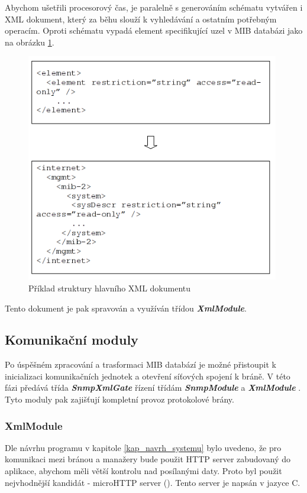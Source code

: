Abychom ušetřili procesorový čas, je paralelně s generováním schématu vytvářen i XML dokument, který za běhu slouží k vyhledávání a ostatním potřebným
operacím. Oproti schématu vypadá element specifikující uzel v MIB databázi jako na obrázku \ref{obr_impl_xml_element}.
\begin{figure}[htp]
	\begin{center}
		\includegraphics[height=10cm]{obrazky/05_element_xml.png}
		\caption{Příklad struktury hlavního XML dokumentu}
		\label{obr_impl_xml_element}
	\end{center}
\end{figure}

Tento dokument je pak spravován a využíván třídou \textit{\textbf{XmlModule}}.


\subsection{Komunikační moduly}
Po úspěšném zpracování a trasformaci MIB databází je možné přistoupit k inicializaci komunikačních jednotek a otevření síťových spojení k bráně.
V této fázi předává třída \textit{ \textbf{SnmpXmlGate} } řízení třídám \textit{ \textbf{SnmpModule} } a \textit{ \textbf{XmlModule} }. Tyto
moduly pak zajišťují kompletní provoz protokolové brány.

\subsubsection*{XmlModule}
\label{kap_impl_xmlmod}
Dle návrhu programu v kapitole \ref{kap_navrh_systemu} bylo uvedeno, že pro komunikaci mezi bránou a manažery bude použit HTTP server zabudovaný do
aplikace, abychom měli větší kontrolu nad posílanými daty. Proto byl použit nejvhodnější kandidát - microHTTP server (\cite{libmicrohttpd}).
Tento server je napsán v jazyce C. 

